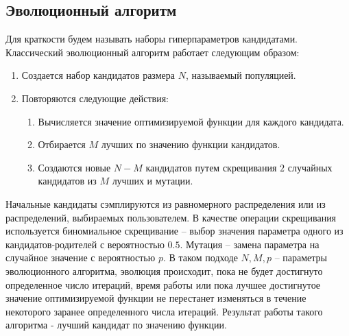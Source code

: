 \documentclass[a4paper,12pt]{article}
\begin{document}
\subsection{Эволюционный алгоритм}
Для краткости будем называть наборы гиперпараметров кандидатами. Классический эволюционный алгоритм работает следующим образом:
\begin{enumerate}
    \item Создается набор кандидатов размера $N$, называемый популяцией.
    \item Повторяются следующие действия:
    \begin{enumerate}
        \item Вычисляется значение оптимизируемой функции для каждого кандидата.
        \item Отбирается $M$ лучших по значению функции кандидатов.
        \item Создаются новые $N - M$ кандидатов путем скрещивания $2$ случайных кандидатов из $M$ лучших и мутации.
    \end{enumerate}
\end{enumerate}

Начальные кандидаты сэмплируются из равномерного распределения или из распределений, выбираемых пользователем.
В качестве операции скрещивания используется биномиальное скрещивание -- выбор значения параметра одного из кандидатов-родителей с вероятностью $0.5$. Мутация -- замена параметра на случайное значение с вероятностью $p$. В таком подходе $N, M, p$ -- параметры эволюционного алгоритма, эволюция происходит, пока не будет достигнуто определенное число итераций, время работы или пока лучшее достигнутое значение оптимизируемой функции не перестанет изменяться в течение некоторого заранее определенного числа итераций. Результат работы такого алгоритма - лучший кандидат по значению функции. 
\end{document}

